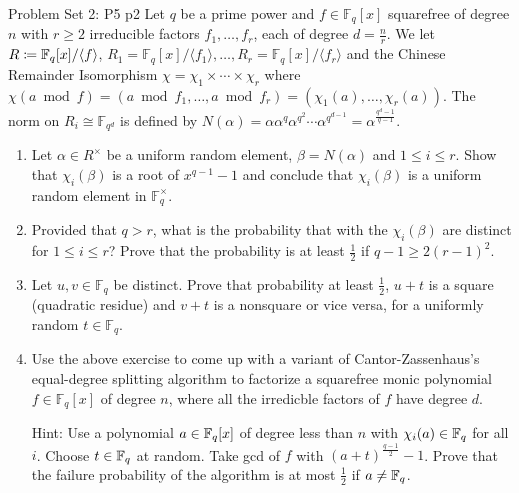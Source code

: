 \documentclass[a4paper, 11pt]{article}
\begin{document}
\begin{problem}{%
		Problem Set 2: P5
	}{p2%
	}
Let $q$ be a prime power and $f\in \mathbb{F}_q[x]$ squarefree of degree $n$ with $r\geq 2$ irreducible factors $f_1,\dots,f_r$, each of degree $d=\frac{n}{r}$. We let $R\coloneqq \mathbb{F}_q[x]/\langle f\rangle$, $R_1=\mathbb{F}_q[x]/\langle f_1\rangle, \dots ,R_r= \mathbb{F}_q[x]/\langle f_r\rangle$ and the Chinese Remainder Isomorphism $\chi=\chi_1\times \cdots \times \chi_r$ where $\chi(a\bmod f)=(a\bmod {f_1},\dots, a\bmod{f_r})=(\chi_1(a),\dots, \chi_r(a))$. The norm on $R_i\cong \mathbb{F}_{q^d}$ is defined by $N(\alpha)=\alpha \alpha^q\alpha^{q^2}\cdots\alpha^{q^{d-1}}=\alpha^{\frac{q^d-1}{q-1}}$.\begin{enumerate}[label=(\alph*)]
	\item Let $\alpha\in R^{\times}$ be a uniform random element, $\beta=N(\alpha)$ and $1\leq i\leq r$. Show that $\chi_i(\beta)$ is a root of $x^{q-1}-1$ and conclude that $\chi_i(\beta)$ is a uniform random element in $\mathbb{F}_q^{\times}$.
	\item Provided that $q>r$, what is the probability that with the $\chi_i(\beta)$ are distinct for $1\leq i\leq r$? Prove that the probability is at least $\frac12$ if $q-1\geq 2(r-1)^2$.
	\item Let $u,v\in \mathbb{F}_q$ be distinct. Prove that probability at least $\frac12$, $u+t$ is a square (quadratic residue) and $v+t$ is a nonsquare or vice versa, for a uniformly random $t\in \mathbb{F}_q$.
	\item Use the above exercise to come up with a variant of Cantor-Zassenhaus’s equal-degree splitting
	algorithm to factorize a squarefree monic polynomial $f\in\mathbb{F}_q[x]$ of degree $n$, where all the irredicble factors of $f$ have degree $d$. 
	
	Hint: Use a polynomial $a\in \mathbb{F}_q[x]$ of degree less than $n$ with $\chi_i(a)\in \mathbb{F}_q$ for all $i$. Choose $t\in \mathbb{F}_q$ at random. Take gcd of $f$ with $(a+t)^{\frac{q-1}{2}}-1$. Prove that the failure probability of the algorithm is at most $\frac12$ if $a\neq \mathbb{F}_q$.
\end{enumerate}
\end{problem}
\end{document}
